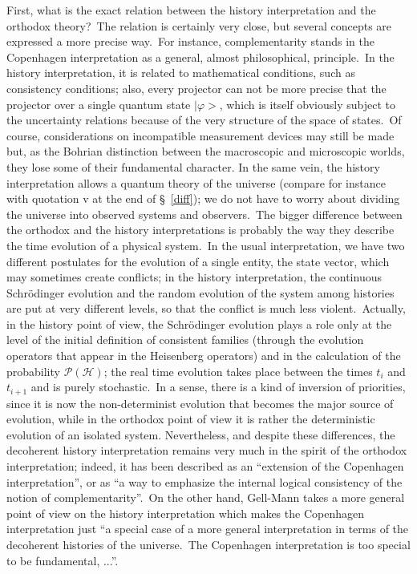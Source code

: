 \documentclass[12pt,onecolumn]{article}%
\begin{document}
First, what is the exact relation between the history interpretation and the
orthodox theory?\ The relation is certainly very close, but several concepts
are expressed a more precise way.\ For instance, complementarity stands in the
Copenhagen interpretation as a general, almost philosophical, principle.\ In
the history interpretation, it is related to mathematical conditions, such as
consistency conditions; also, every projector can not be more precise that the
projector over a single quantum state $\mid\varphi>$, which is itself
obviously subject to the uncertainty relations because of the very structure
of the space of states.\ Of course, considerations on incompatible measurement
devices may still be made but, as the Bohrian distinction between the
macroscopic and microscopic worlds, they lose some of their fundamental
character. In the same vein, the history interpretation allows a quantum
theory of the universe (compare for instance with quotation v at the end of
\S \ \ref{diff}); we do not have to worry about dividing the universe into
observed systems and observers.\ The bigger difference between the orthodox
and the history interpretations is probably the way they describe the time
evolution of a physical system.\ In the usual interpretation, we have two
different postulates for the evolution of a single entity, the state vector,
which may sometimes create conflicts; in the history interpretation, the
continuous Schr\"{o}dinger evolution and the random evolution of the system
among histories are put at very different levels, so that the conflict is much
less violent.\ Actually, in the history point of view, the Schr\"{o}dinger
evolution plays a role only at the level of the initial definition of
consistent families (through the evolution operators that appear in the
Heisenberg operators) and in the calculation of the probability $\mathcal{P}%
\mathbb{(\mathcal{H})}$; the real time evolution takes place between the times
$t_{i}$ and $t_{i+1}$ and is purely stochastic.\ In a sense, there is a kind
of inversion of priorities, since it is now the non-determinist evolution that
becomes the major source of evolution, while in the orthodox point of view it
is rather the deterministic evolution of an isolated system. Nevertheless, and
despite these differences, the decoherent history interpretation remains very
much in the spirit of the orthodox interpretation; indeed, it has been
described as an ``extension of the Copenhagen interpretation'', or as ``a way
to emphasize the internal logical consistency of the notion of
complementarity''.\ On the other hand, Gell-Mann takes a more general point of
view on the history interpretation which makes the Copenhagen interpretation
just ``a special case of a more general interpretation in terms of the
decoherent histories of the universe.\ The Copenhagen interpretation is too
special to be fundamental, ...''\cite{reactions}.
\end{document}
